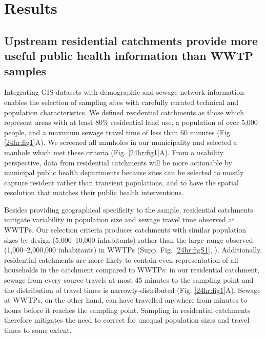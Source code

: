 \section{Results}

\subsection{Upstream residential catchments provide more useful public health information than WWTP samples}

Integrating GIS datasets with demographic and sewage network information enables the selection of sampling sites with carefully curated technical and population characteristics. We defined residential catchments as those which represent areas with at least 80\% residential land use, a population of over 5,000 people, and a maximum sewage travel time of less than 60 minutes (Fig. \ref{24hr:fig1}A). We screened all manholes in our municipality and selected a manhole which met these criteria (Fig. \ref{24hr:fig1}A). From a usability perspective, data from residential catchments will be more actionable by municipal public health departments because sites can be selected to mostly capture resident rather than transient populations, and to have the spatial resolution that matches their public health interventions.

Besides providing geographical specificity to the sample, residential catchments mitigate variability in population size and sewage travel time observed at WWTPs. Our selection criteria produces catchments with similar population sizes by design (5,000--10,000 inhabitants) rather than the large range observed (1,000--2,000,000 inhabitants) in WWTPs (Supp. Fig. \ref{24hr:figS1}, \cite{Newtown2015}). Additionally, residential catchments are more likely to contain even representation of all households in the catchment compared to WWTPs: in our residential catchment, sewage from every source travels at most 45 minutes to the sampling point and the distribution of travel times is narrowly-distributed (Fig. \ref{24hr:fig1}A). Sewage at WWTPs, on the other hand, can have travelled anywhere from minutes to hours before it reaches the sampling point. Sampling in residential catchments therefore mitigates the need to correct for unequal population sizes and travel times to some extent.

